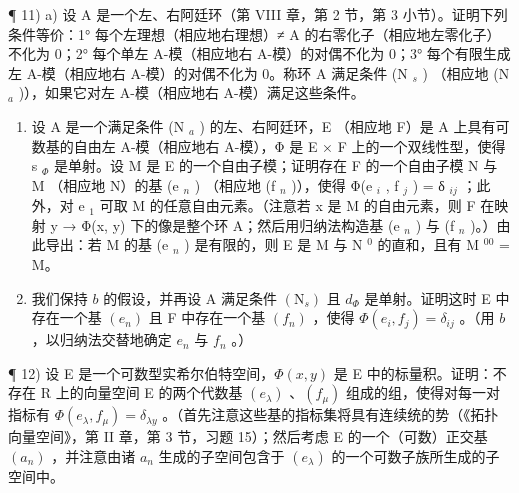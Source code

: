 ¶ 11) a) 设 A 是一个左、右阿廷环（第 VIII 章，第 2 节，第 3 小节）。证明下列条件等价：1° 每个左理想（相应地右理想）≠ A 的右零化子（相应地左零化子）不化为 0；2° 每个单左 A-模（相应地右 A-模）的对偶不化为 0；3° 每个有限生成左 A-模（相应地右 A-模）的对偶不化为 0。称环 A 满足条件 (N \(_{s}\) ) （相应地 (N \(_{a}\) )），如果它对左 A-模（相应地右 A-模）满足这些条件。

\begin{enumerate}
\def\labelenumi{\alph{enumi})}
\setcounter{enumi}{1}
\item
  设 A 是一个满足条件 (N \(_{a}\) ) 的左、右阿廷环，E （相应地 F）是 A 上具有可数基的自由左 A-模（相应地右 A-模），Φ 是 E × F 上的一个双线性型，使得 s \(_{\Phi}\) 是单射。设 M 是 E 的一个自由子模；证明存在 F 的一个自由子模 N 与 M （相应地 N）的基 (e \(_{n}\) ) （相应地 (f \(_{n}\) )），使得 Φ(e \(_{i}\) , f \(_{j}\) ) = δ \(_{ij}\) ；此外，对 e \(_{1}\) 可取 M 的任意自由元素。（注意若 x 是 M 的自由元素，则 F 在映射 y → Φ(x, y) 下的像是整个环 A；然后用归纳法构造基 (e \(_{n}\) ) 与 (f \(_{n}\) )。）由此导出：若 M 的基 (e \(_{n}\) ) 是有限的，则 E 是 M 与 N \(^{0}\) 的直和，且有 M \(^{00}\) = M。
\item
  我们保持 \(b\) 的假设，并再设 A 满足条件 \((\mathrm{N}_{s})\) 且 \(d_{\Phi}\) 是单射。证明这时 E 中存在一个基 \((e_{n})\) 且 F 中存在一个基 \((f_{n})\) ，使得 \(\Phi(e_{i}, f_{j}) = \delta_{ij}\) 。（用 \(b\) ，以归纳法交替地确定 \(e_{n}\) 与 \(f_{n}\) 。）
\end{enumerate}

¶ 12) 设 E 是一个可数型实希尔伯特空间，\(\Phi(x, y)\) 是 E 中的标量积。证明：不存在 R 上的向量空间 E 的两个代数基 \((e_{\lambda})\) 、\((f_{\mu})\) 组成的组，使得对每一对指标有 \(\Phi(e_{\lambda}, f_{\mu}) = \delta_{\lambda y}\) 。（首先注意这些基的指标集将具有连续统的势（《拓扑向量空间》，第 II 章，第 3 节，习题 15）；然后考虑 E 的一个（可数）正交基 \((a_n)\) ，并注意由诸 \(a_n\) 生成的子空间包含于 \((e_{\lambda})\) 的一个可数子族所生成的子空间中。

